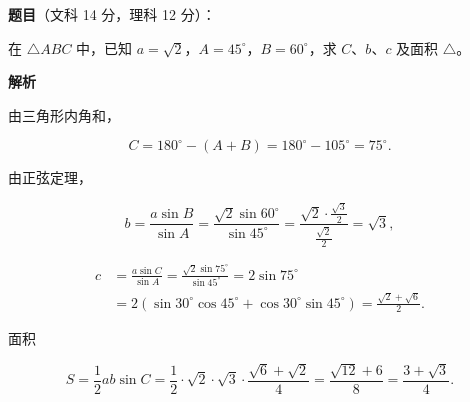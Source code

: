 \begin{answer}

\textbf{题目}（文科 14 分，理科 12 分）：

在 $\triangle ABC$ 中，已知 $a=\sqrt2$，$A=45^\circ$，$B=60^\circ$，求 $C$、$b$、$c$ 及面积 $\triangle$。
\nopagebreak[4]
\begin{center}\end{center}
\nopagebreak[4]
\textbf{解析}
\nopagebreak[4]
\begin{center}\end{center}
\nopagebreak[4]
由三角形内角和，

\nopagebreak[4]
\[
C=180^\circ-(A+B)=180^\circ-105^\circ=75^\circ.
\]

由正弦定理，

\nopagebreak[4]
\[
b=\frac{a\sin B}{\sin A}
=\frac{\sqrt2\sin60^\circ}{\sin45^\circ}
=\frac{\sqrt2\cdot\frac{\sqrt3}{2}}{\frac{\sqrt2}{2}}
=\sqrt3,
\]

\nopagebreak[4]
\[
\begin{aligned}
c&=\frac{a\sin C}{\sin A}
=\frac{\sqrt2\sin75^\circ}{\sin45^\circ}
=2\sin75^\circ\\
&=2\left(\sin30^\circ\cos45^\circ+\cos30^\circ\sin45^\circ\right)
=\frac{\sqrt2+\sqrt6}{2}.
\end{aligned}
\]

面积

\nopagebreak[4]
\[
S=\frac12ab\sin C
=\frac12\cdot\sqrt2\cdot\sqrt3\cdot\frac{\sqrt6+\sqrt2}{4}
=\frac{\sqrt{12}+6}{8}
=\frac{3+\sqrt3}{4}.
\]


\end{answer}
